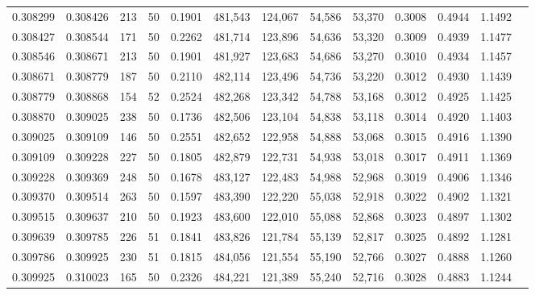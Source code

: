\begin{tabular}{rrrrrrrrrrrrr}
0.308299 & 0.308426 &   213 &  50 &                                     0.1901 & 481,543 & 124,067 &  54,586 &  53,370 & 0.3008 & 0.4944 & 1.1492 \\
0.308427 & 0.308544 &   171 &  50 &                                     0.2262 & 481,714 & 123,896 &  54,636 &  53,320 & 0.3009 & 0.4939 & 1.1477 \\
0.308546 & 0.308671 &   213 &  50 &                                     0.1901 & 481,927 & 123,683 &  54,686 &  53,270 & 0.3010 & 0.4934 & 1.1457 \\
0.308671 & 0.308779 &   187 &  50 &                                     0.2110 & 482,114 & 123,496 &  54,736 &  53,220 & 0.3012 & 0.4930 & 1.1439 \\
0.308779 & 0.308868 &   154 &  52 &                                     0.2524 & 482,268 & 123,342 &  54,788 &  53,168 & 0.3012 & 0.4925 & 1.1425 \\
0.308870 & 0.309025 &   238 &  50 &                                     0.1736 & 482,506 & 123,104 &  54,838 &  53,118 & 0.3014 & 0.4920 & 1.1403 \\
0.309025 & 0.309109 &   146 &  50 &                                     0.2551 & 482,652 & 122,958 &  54,888 &  53,068 & 0.3015 & 0.4916 & 1.1390 \\
0.309109 & 0.309228 &   227 &  50 &                                     0.1805 & 482,879 & 122,731 &  54,938 &  53,018 & 0.3017 & 0.4911 & 1.1369 \\
0.309228 & 0.309369 &   248 &  50 &                                     0.1678 & 483,127 & 122,483 &  54,988 &  52,968 & 0.3019 & 0.4906 & 1.1346 \\
0.309370 & 0.309514 &   263 &  50 &                                     0.1597 & 483,390 & 122,220 &  55,038 &  52,918 & 0.3022 & 0.4902 & 1.1321 \\
0.309515 & 0.309637 &   210 &  50 &                                     0.1923 & 483,600 & 122,010 &  55,088 &  52,868 & 0.3023 & 0.4897 & 1.1302 \\
0.309639 & 0.309785 &   226 &  51 &                                     0.1841 & 483,826 & 121,784 &  55,139 &  52,817 & 0.3025 & 0.4892 & 1.1281 \\
0.309786 & 0.309925 &   230 &  51 &                                     0.1815 & 484,056 & 121,554 &  55,190 &  52,766 & 0.3027 & 0.4888 & 1.1260 \\
0.309925 & 0.310023 &   165 &  50 &                                     0.2326 & 484,221 & 121,389 &  55,240 &  52,716 & 0.3028 & 0.4883 & 1.1244 \\

\end{tabular}
